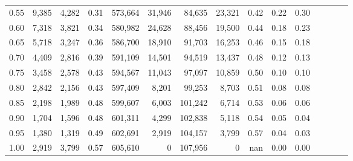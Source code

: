 \begin{tabular}{rrrcrrrrrrrrrrr}
0.55 &    9,385 &   4,282 &                                       0.31 &  573,664 &   31,946 &   84,635 &   23,321 &  0.42 &  0.22 &                         0.30 \\
0.60 &    7,318 &   3,821 &                                       0.34 &  580,982 &   24,628 &   88,456 &   19,500 &  0.44 &  0.18 &                         0.23 \\
0.65 &    5,718 &   3,247 &                                       0.36 &  586,700 &   18,910 &   91,703 &   16,253 &  0.46 &  0.15 &                         0.18 \\
0.70 &    4,409 &   2,816 &                                       0.39 &  591,109 &   14,501 &   94,519 &   13,437 &  0.48 &  0.12 &                         0.13 \\
0.75 &    3,458 &   2,578 &                                       0.43 &  594,567 &   11,043 &   97,097 &   10,859 &  0.50 &  0.10 &                         0.10 \\
0.80 &    2,842 &   2,156 &                                       0.43 &  597,409 &    8,201 &   99,253 &    8,703 &  0.51 &  0.08 &                         0.08 \\
0.85 &    2,198 &   1,989 &                                       0.48 &  599,607 &    6,003 &  101,242 &    6,714 &  0.53 &  0.06 &                         0.06 \\
0.90 &    1,704 &   1,596 &                                       0.48 &  601,311 &    4,299 &  102,838 &    5,118 &  0.54 &  0.05 &                         0.04 \\
0.95 &    1,380 &   1,319 &                                       0.49 &  602,691 &    2,919 &  104,157 &    3,799 &  0.57 &  0.04 &                         0.03 \\
1.00 &    2,919 &   3,799 &                                       0.57 &  605,610 &        0 &  107,956 &        0 &   nan &  0.00 &                         0.00 \\
\bottomrule
\end{tabular}
